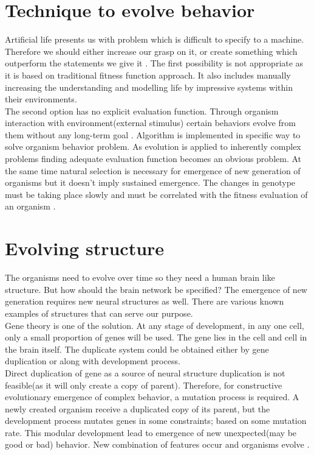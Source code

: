 \documentclass[conference]{IEEEtran}
\begin{document}
\section{Technique to evolve behavior}
Artificial life presents us with problem which is difficult to specify to a machine. Therefore we should either increase our grasp on it, or create something which outperform the statements we give it \cite{channon&damper}. The first possibility is not appropriate as it is based on traditional fitness function approach. It also includes manually increasing the understanding and modelling life by impressive systems within their environments.\\
The second option has no explicit evaluation function. Through organism interaction with environment(external stimulus) certain behaviors evolve from them without any long-term goal \cite{soccer-game-evolution}. Algorithm is implemented in specific way to solve organism behavior problem. As evolution is applied to inherently complex problems \cite{algorithms-and-experiments} finding adequate evaluation function becomes an obvious problem. At the same time natural selection is necessary for emergence of new generation of organisms but it doesn't imply sustained emergence. The changes in genotype must be taking place slowly and must be correlated with the fitness evaluation of an organism \cite{mapping-genotype-phenotype}.

\section{Evolving structure}
The organisms need to evolve over time so they need a human brain like structure. But how should the brain network be specified? The emergence of new generation requires new neural structures as well. There are various known examples of structures that can serve our purpose.\\
Gene theory is one of the solution. At any stage of development, in any one cell, only a small proportion of genes will be used. The gene lies in the cell and cell in the brain itself. The duplicate system could be obtained either by gene duplication or along with development process.\\
Direct duplication of gene as a source of neural structure duplication is not feasible(as it will only create a copy of parent). Therefore, for constructive evolutionary emergence of complex behavior, a mutation process is required. A newly created organism receive a duplicated copy of its parent, but the development process mutates genes in some constraints; based on some mutation rate. This modular development lead to emergence of new unexpected(may be good or bad) behavior. New combination of features occur and organisms evolve \cite{Stanley}.
\end{document}
